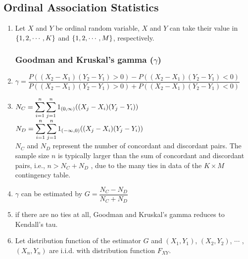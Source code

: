 \subsection{Ordinal Association Statistics}


\begin{enumerate}
    \item Let $X$ and $Y$ be ordinal random variable, $X$ and $Y$ can take their value in $\left\{1, 2, \cdots , K \right\}$ and $\left\{1, 2, \cdots , M\right\}$, respectively.
    \hfill \cite{statistics/book/Statistics-for-Data-Scientists/Maurits-Kaptein}

\subsubsection{Goodman and Kruskal’s gamma ($\gamma$)}

    \item 
    $
        \gamma
        = \dfrac{
            P((X_2 - X_1)(Y_2 - Y_1) > 0) - P((X_2 - X_1)(Y_2 - Y_1) < 0)
        }{
            P((X_2 - X_1)(Y_2 - Y_1) > 0) + P((X_2 - X_1)(Y_2 - Y_1) < 0)
        }
    $
    \hfill \cite{statistics/book/Statistics-for-Data-Scientists/Maurits-Kaptein}

    \item 
    $ N_C = \displaystyle\sum^n_{i=1} \displaystyle\sum^n_{j=1} 1_{(0,\infty)} ((X_j - X_i )(Y_j - Y_i )) $
    \hfill
    $ N_D = \displaystyle\sum^n_{i=1} \displaystyle\sum^n_{j=1} 1_{(-\infty, 0)} ((X_j - X_i )(Y_j - Y_i )) $
    \hfill \cite{statistics/book/Statistics-for-Data-Scientists/Maurits-Kaptein}
    \\[0.3cm]
    $N_C$ and $N_D$ represent the number of concordant and discordant pairs. 
    The sample size $n$ is typically larger than the sum of concordant and discordant pairs, i.e., $n > N_C + N_D$ , due to the many ties in data of the $K \times M$ contingency table.
    \hfill \cite{statistics/book/Statistics-for-Data-Scientists/Maurits-Kaptein}

    \item $\gamma$ can be estimated by $G = \dfrac{N_C - N_D}{N_C + N_D}$
    \hfill \cite{statistics/book/Statistics-for-Data-Scientists/Maurits-Kaptein}

    \item if there are no ties at all, Goodman and Kruskal’s gamma reduces to Kendall’s tau.
    \hfill \cite{statistics/book/Statistics-for-Data-Scientists/Maurits-Kaptein}

    \item Let distribution function of the estimator $G$ and $(X_1, Y_1)$, $(X_2, Y_2)$, $\cdots$ , $(X_n , Y_n )$ are i.i.d. with distribution function $F_{X Y }$.
    \hfill \cite{statistics/book/Statistics-for-Data-Scientists/Maurits-Kaptein}


\end{enumerate}
